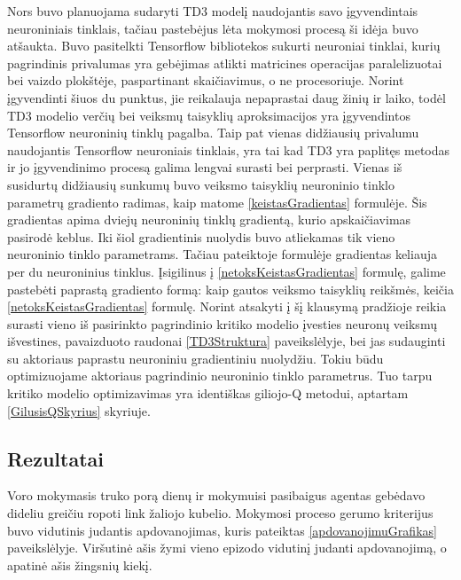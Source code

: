 \documentclass[a4paper, 12pt]{article}
\begin{document}
Nors buvo planuojama sudaryti TD3 modelį naudojantis savo įgyvendintais neuroniniais tinklais, tačiau pastebėjus lėta mokymosi procesą ši idėja buvo atšaukta. Buvo pasitelkti Tensorflow bibliotekos sukurti neuroniai tinklai, kurių pagrindinis privalumas yra gebėjimas atlikti matricines operacijas paralelizuotai bei vaizdo plokštėje, paspartinant skaičiavimus, o ne procesoriuje. Norint įgyvendinti šiuos du punktus, jie reikalauja nepaprastai daug žinių ir laiko, todėl TD3 modelio verčių bei veiksmų taisyklių aproksimacijos yra įgyvendintos Tensorflow neuroninių tinklų pagalba. Taip pat vienas didžiausių privalumu naudojantis Tensorflow neuroniais tinklais, yra tai kad TD3 yra paplitęs metodas ir jo įgyvendinimo procesą galima lengvai surasti bei perprasti. Vienas iš susidurtų didžiausių sunkumų buvo veiksmo taisyklių neuroninio tinklo parametrų gradiento radimas, kaip matome \ref{keistasGradientas} formulėje. Šis gradientas apima dviejų neuroninių tinklų gradientą, kurio apskaičiavimas pasirodė keblus. Iki šiol gradientinis nuolydis buvo atliekamas tik vieno neuroninio tinklo parametrams. Tačiau pateiktoje formulėje gradientas keliauja per du neuroninius tinklus. Įsigilinus į \ref{netoksKeistasGradientas} formulę, galime pastebėti paprastą gradiento formą: kaip gautos veiksmo taisyklių reikšmės, keičia \ref{netoksKeistasGradientas} formulę. Norint atsakyti į šį klausymą pradžioje reikia surasti vieno iš pasirinkto pagrindinio kritiko modelio įvesties neuronų veiksmų išvestines, pavaizduoto raudonai \ref{TD3Struktura} paveikslėlyje, bei jas sudauginti su aktoriaus paprastu neuroniniu gradientiniu nuolydžiu. Tokiu būdu optimizuojame aktoriaus pagrindinio neuroninio tinklo parametrus. Tuo tarpu kritiko modelio optimizavimas yra identiškas giliojo-Q metodui, aptartam \ref{GilusisQSkyrius} skyriuje.

\subsection{Rezultatai}


Voro mokymasis truko porą dienų ir mokymuisi pasibaigus agentas gebėdavo dideliu greičiu ropoti link žaliojo kubelio. Mokymosi proceso gerumo kriterijus buvo vidutinis judantis apdovanojimas, kuris pateiktas \ref{apdovanojimuGrafikas} paveikslėlyje. Viršutinė ašis žymi vieno epizodo vidutinį judanti apdovanojimą, o apatinė ašis žingsnių kiekį.
\end{document}
